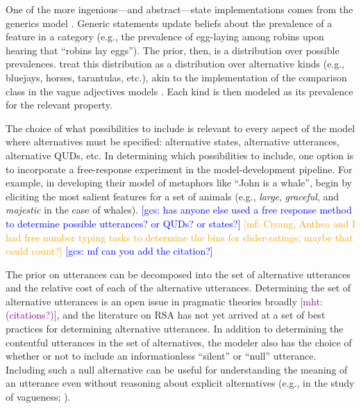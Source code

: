 \documentclass{sp}
\newcommand{\gcs}[1]{\textcolor{blue}{[gcs: #1]}}
\newcommand{\mf}[1]{\textcolor{orange}{[mf: #1]}}
\newcommand{\mht}[1]{\textcolor{purple}{[mht: #1]}}
\begin{document}
One of the more ingenious---and abstract---state implementations comes from the generics model \citep{tesslergoodman2019}. Generic statements update beliefs about the prevalence of a feature in a category (e.g., the prevalence of egg-laying among robins upon hearing that ``robins lay eggs''). The prior, then, is a distribution over possible prevalences. \citeauthor{tesslergoodman2019} treat this distribution as a distribution over alternative kinds (e.g., bluejays, horses, tarantulas, etc.), akin to the implementation of the comparison class in the vague adjectives models \citep{lassitergoodman2013, tessler2017comparisonclass}. Each kind is then modeled as its prevalence for the relevant property.

The choice of what possibilities to include is relevant to every aspect of the model where alternatives must be specified: alternative states, alternative utterances, alternative QUDs, etc. In determining which possibilities to include, one option is to incorporate a free-response experiment in the model-development pipeline. For example, in developing their model of metaphors like ``John is a whale'', \cite{kaoetal2014metaphor} begin by eliciting the most salient features for a set of animals (e.g., \emph{large}, \emph{graceful}, and \emph{majestic} in the case of whales).
\gcs{has anyone else used a free response method to determine possible utterances? or QUDs? or states?} \mf{Ciyang, Anthea and I had free number typing tasks to determine the bins for slider-ratings; maybe that could count?} \gcs{mf can you add the citation?}


The prior on utterances can be decomposed into the set of alternative utterances and the relative cost of each of the alternative utterances.
Determining the set of alternative utterances is an open issue in pragmatic theories broadly \mht{(citations?)}, and the literature on RSA has not yet arrived at a set of best practices for determining alternative utterances. 
In addition to determining the contentful utterances in the set of alternatives, the modeler also has the choice of whether or not to include an informationless ``silent'' or ``null'' utterance. 
Including such a null alternative can be useful for understanding the meaning of an utterance even without reasoning about explicit alternatives (e.g., in the study of vagueness; \citealp{lassitergoodman2013}).
\end{document}
